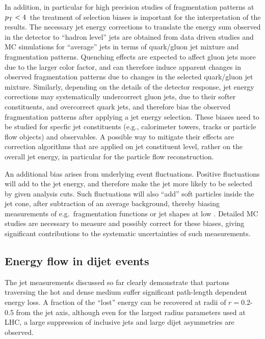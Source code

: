 In addition, in particular for high precision studies of fragmentation patterns at $\mbox{$p_{\mathrm{T}}$} < 4$\GeVc\, 
the treatment of selection biases is important for the interpretation of the results. The necessary jet energy 
corrections to translate the energy sum observed in the detector to ``hadron level'' jets are 
obtained from data driven studies and MC simulations for ``average'' jets in terms of quark/gluon 
jet mixture and fragmentation patterns. Quenching effects are expected to affect gluon jets more
due to the larger color factor, and can therefore induce apparent changes in observed fragmentation
patterns due to changes in the selected quark/gluon jet mixture. Similarly, depending on the 
details of the detector response, jet energy corrections may systematically undercorrect gluon 
jets, due to their softer constituents, and overcorrect quark jets, and therefore bias the 
observed fragmentation patterns after applying a jet energy selection. These biases need to be
studied for specfic jet constituents (e.g., calorimeter towers, tracks or particle flow objects)
and observables. A possible way to mitigate their effects are correction algorithms that 
are applied on jet constituent level, rather on the overall jet energy, in particular for
the particle flow reconstruction. 

An additional bias arises from underlying event fluctuations. Positive fluctuations will add to the 
jet energy, and therefore make the jet more likely to be selected by given analysis cuts. Such
fluctuations will also ``add'' soft particles inside the jet cone, after subtraction of an 
average background, thereby biasing measurements of e.g.\ fragmentation functions or 
jet shapes at low \pT. Detailed MC studies are necessary to measure and possibly correct
for these biases, giving significant contributions to the systematic uncertainties of 
such measurements.


\subsection{Energy flow in dijet events}

The jet measurements discussed so far clearly demonstrate that partons traversing the hot and dense
medium suffer significant path-length dependent energy loss. A fraction of the ``lost'' energy
can be recovered at radii of $r=$0.2-0.5 from the jet axis, although even for the largest radius
parameters used at LHC, a large suppression of inclusive jets and large dijet asymmetries are
observed.

